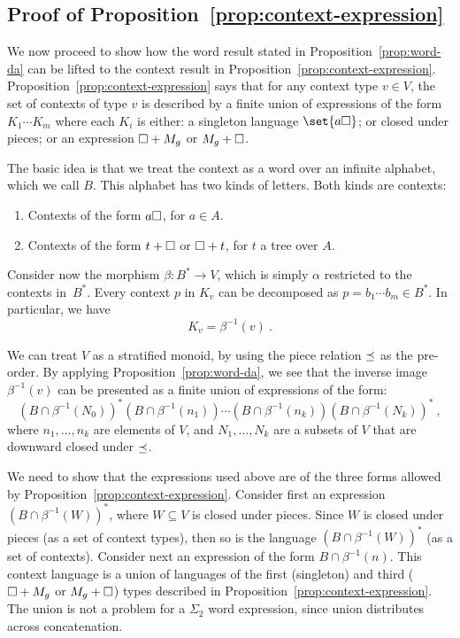 \documentclass{LMCS}
\begin{document}
\subsection{Proof of Proposition~\ref{prop:context-expression}}
\label{sec:proof-prop-refpr}
We now proceed to show how the word result stated in
Proposition~\ref{prop:word-da} can be lifted to the context result in
Proposition~\ref{prop:context-expression}. Proposition~\ref{prop:context-expression}
says that for any context type $v \in V$, the set of contexts of type $v$
  is described by a finite union of expressions of the form $K_{1} \cdots
K_{m}$ where each $K_{i}$ is either: a singleton language $\set{a \hole}$; or
closed under pieces; or an expression $\Box + M_g$ or $M_g + \Box$.

The basic idea is that we treat the context as a word over an infinite
alphabet, which we call $B$. This alphabet has two kinds of letters.
Both kinds are contexts:
\begin{enumerate}[$\bullet$]
\item Contexts of the form $a \Box$, for $a \in A$.
\item Contexts of the form $t + \Box$ or $\Box + t$, for $t$ a tree
  over $A$.
\end{enumerate}

Consider now the morphism $\beta : B^* \to V$, which is simply $\alpha$
restricted to the contexts in~$B^*$.  Every context $p$ in $K_v$ can be
decomposed as $p=b_1 \cdots b_m \in B^*$. In particular, we have
\[
  K_v =\beta^{-1}(v)\ .
\]

We can treat $V$ as a stratified monoid, by using the piece relation
$\preceq$ as the pre-order. By applying Proposition~\ref{prop:word-da}, we
see that the inverse image $\beta^{-1}(v)$ can be presented as a
finite union of expressions of the form:
  \[
     (B \cap \beta^{-1}(N_0))^*  (B \cap \beta^{-1}(n_1)) \cdots 
    (B \cap \beta^{-1}(n_k))  (B \cap \beta^{-1}(N_k))^*\ ,
  \]
  where $n_1,\ldots,n_k$ are elements of $V$, and $N_1,\ldots,N_k$ are
  a subsets of $V$ that are downward closed under $\preceq$.

  We need to show that the expressions used above are of the three
  forms allowed by Proposition~\ref{prop:context-expression}.
  Consider first an expression $(B \cap \beta^{-1}(W))^*$, where $W
  \subseteq V$ is closed under pieces. Since $W$ is closed under
  pieces (as a set of context types), then so is the language $(B \cap
  \beta^{-1}(W))^*$ (as a set of contexts).  Consider next an
  expression of the form $B \cap \beta^{-1}(n)$. This context language
  is a union of languages of the first (singleton) and third ($\Box +
  M_g$ or $M_g + \Box$) types described in
  Proposition~\ref{prop:context-expression}.  The union is not a
  problem for a $\Sigma_2$ word expression, since union distributes
  across concatenation.
\end{document}
